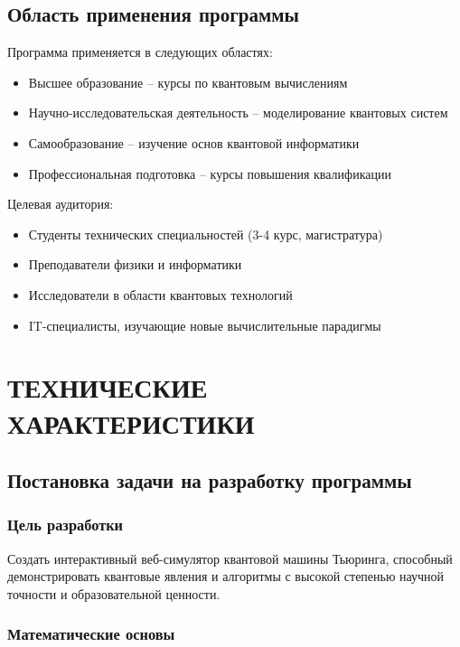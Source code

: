 \documentclass[14pt,russian]{extarticle}
\begin{document}
\subsection{Область применения программы}

Программа применяется в следующих областях:
\begin{itemize}
    \item Высшее образование -- курсы по квантовым вычислениям
    \item Научно-исследовательская деятельность -- моделирование квантовых систем
    \item Самообразование -- изучение основ квантовой информатики
    \item Профессиональная подготовка -- курсы повышения квалификации
\end{itemize}

Целевая аудитория:
\begin{itemize}
    \item Студенты технических специальностей (3-4 курс, магистратура)
    \item Преподаватели физики и информатики
    \item Исследователи в области квантовых технологий
    \item IT-специалисты, изучающие новые вычислительные парадигмы
\end{itemize}

\section{ТЕХНИЧЕСКИЕ ХАРАКТЕРИСТИКИ}

\subsection{Постановка задачи на разработку программы}

\subsubsection{Цель разработки}

Создать интерактивный веб-симулятор квантовой машины Тьюринга, 
способный демонстрировать квантовые явления и алгоритмы с высокой 
степенью научной точности и образовательной ценности.

\subsubsection{Математические основы}
\end{document}

